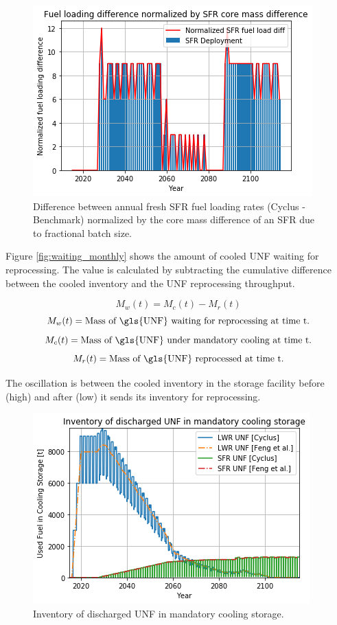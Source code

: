 \begin{figure}[htbp!]
	\begin{center}
		\includegraphics[scale=0.7]{./images/results_18/fuel_load_diff_norm.png}
	\end{center}
	\caption{Difference between annual fresh \gls{SFR} fuel loading rates (Cyclus - Benchmark) normalized by the core mass difference of an \gls{SFR} due to fractional batch size.}
	\label{fig:fuel_load_diff_norm}
\end{figure}


Figure \ref{fig:waiting_monthly} shows the amount of cooled \gls{UNF} waiting for
reprocessing. The value is calculated by subtracting the cumulative difference between
the cooled inventory and the \gls{UNF} reprocessing throughput.

\[ M_{w}(t) = M_{c}(t) - M_{r}(t) \]
\[ M_{w}(t) = \text{Mass of \gls{UNF} waiting for reprocessing at time t.}\]
\[ M_{c}(t) = \text{Mass of \gls{UNF} under mandatory cooling at time t.}\]
\[ M_{r}(t) = \text{Mass of \gls{UNF} reprocessed at time t.}\]

The oscillation is between the cooled inventory in the storage facility before (high)
and after (low) it sends its inventory for reprocessing.

\begin{figure}[htbp!]
	\begin{center}
		\includegraphics[scale=0.7]{./images/results_18/fuel_discharge_monthly.png}
	\end{center}
	\caption{Inventory of discharged \gls{UNF} in mandatory cooling storage.}
	\label{fig:fuel_discharge_monthly}
\end{figure}



